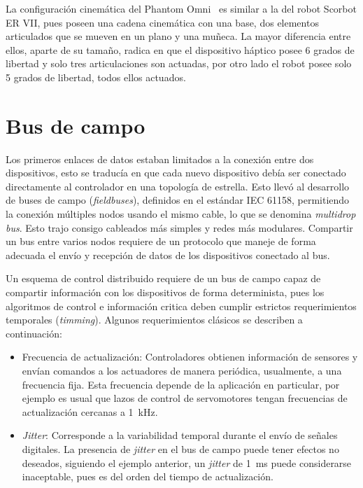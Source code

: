 La configuración cinemática del Phantom Omni \texttrademark \, es similar a la del robot Scorbot ER VII, pues poseen una cadena cinemática con una base, dos elementos articulados que se mueven en un plano y una muñeca. La mayor diferencia entre ellos, aparte de su tamaño, radica en que el dispositivo háptico posee 6 grados de libertad y solo tres articulaciones son actuadas, por otro lado el robot posee solo 5 grados de libertad, todos ellos actuados. 

\section{Bus de campo}

Los primeros enlaces de datos estaban limitados a la conexión entre dos dispositivos, esto se traducía en que cada nuevo dispositivo debía ser conectado directamente al controlador en una topología de estrella. Esto llevó al desarrollo de buses de campo (\textit{fieldbuses}), definidos en el estándar IEC 61158, permitiendo la conexión múltiples nodos usando el mismo cable, lo que se denomina \textit{multidrop bus}. Esto trajo consigo cableados más simples y redes más modulares. Compartir un bus entre varios nodos requiere de un protocolo que maneje de forma adecuada el envío y recepción de datos de los dispositivos conectado al bus.

Un esquema de control distribuido requiere de un bus de campo capaz de compartir información con los dispositivos de forma determinista, pues los algoritmos de control e información critica deben cumplir estrictos requerimientos temporales (\textit{timming}). Algunos requerimientos clásicos se describen a continuación:

\begin{itemize}

\item Frecuencia de actualización: Controladores obtienen información de sensores y envían comandos a los actuadores de manera periódica, usualmente, a una frecuencia fija. Esta frecuencia depende de la aplicación en particular, por ejemplo es usual que lazos de control de servomotores tengan frecuencias de actualización cercanas a \SI{1}{kHz}.

\item \textit{Jitter}: Corresponde a la variabilidad temporal durante el envío de señales digitales. La presencia de \textit{jitter} en el bus de campo puede tener efectos no deseados, siguiendo el ejemplo anterior, un \textit{jitter} de \SI{1}{\milli\second} puede considerarse inaceptable, pues es del orden del tiempo de actualización.

\end{itemize}


